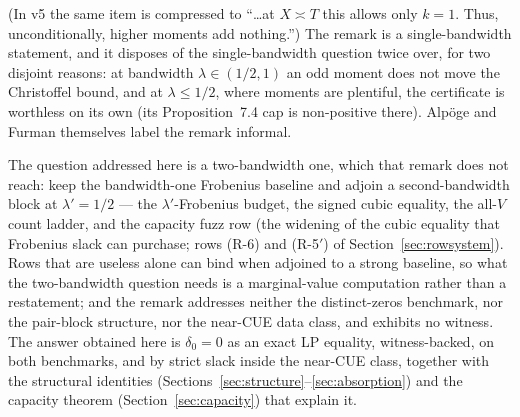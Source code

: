 \documentclass[11pt]{article}
\theoremstyle{plain}
\theoremstyle{definition}
\theoremstyle{remark}
\begin{document}
(In v5 the same item is compressed to ``\ldots at $X \asymp T$ this allows only
$k = 1$. Thus, unconditionally, higher moments add nothing.'') The remark is a
single-bandwidth statement, and it disposes of the single-bandwidth
question twice over, for two disjoint reasons: at bandwidth
$\lambda \in (1/2, 1)$ an odd moment does not move the Christoffel bound, and at
$\lambda \le 1/2$, where moments are plentiful, the certificate is worthless on
its own (its Proposition~7.4 cap is non-positive there). Alp\"oge and Furman
themselves label the remark informal.

The question addressed here is a two-bandwidth one, which that remark does not
reach: keep the bandwidth-one Frobenius baseline and adjoin a
second-bandwidth block at $\lambda' = 1/2$ --- the $\lambda'$-Frobenius budget,
the signed cubic equality, the all-$V$ count ladder, and the capacity fuzz row
(the widening of the cubic equality that Frobenius slack can purchase; rows
(R-6) and (R-5$'$) of Section~\ref{sec:rowsystem}).
Rows that are useless alone can bind when adjoined to a strong baseline, so what
the two-bandwidth question needs is a marginal-value computation rather than a
restatement; and the remark addresses neither the distinct-zeros benchmark, nor
the pair-block structure, nor the near-CUE data class, and exhibits no witness.
The answer obtained here is $\delta_0 = 0$ as an exact LP equality,
witness-backed, on both benchmarks, and by strict slack inside the near-CUE
class, together with the structural identities
(Sections~\ref{sec:structure}--\ref{sec:absorption}) and the capacity theorem
(Section~\ref{sec:capacity}) that explain it.
\end{document}

